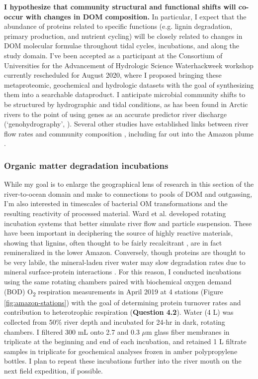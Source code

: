 \documentclass[12pt, letterpaper, twoside]{article}
\begin{document}
\textbf{I hypothesize that community structural and functional shifts will co-occur with changes in DOM composition.} In particular, I expect that the abundance of proteins related to specific functions (e.g. lignin degradation, primary production, and nutrient cycling) will be closely related to changes in DOM molecular formulae throughout tidal cycles, incubations, and along the study domain. I've been accepted as a participant at the Consortium of Universities for the Advancement of Hydrologic Science Waterhackweek workshop currently rescheduled for August 2020, where I proposed bringing these metaproteomic, geochemical and hydrologic datasets with the goal of synthesizing them into a searchable dataproduct. I anticipate microbial community shifts to be structured by hydrographic and tidal conditions, as has been found in Arctic rivers to the point of using genes as an accurate predictor river discharge (‘genohydrography’, \cite{good_predicting_2018}). Several other studies have established links between river flow rates and community composition \cite{crump_synchrony_2005}, including far out into the Amazon plume \cite{doherty_bacterial_2017}. 
 
\bigskip

\subsubsection{Organic matter degradation incubations}

While my goal is to enlarge the geographical lens of research in this section of the river-to-ocean domain and make to connections to pools of DOM and outgassing, I'm also interested in timescales of bacterial OM transformations and the resulting reactivity of processed material. Ward et al. \cite{ward_marine_2018} developed rotating incubation systems that better simulate river flow and particle suspension. These have been important in deciphering the source of highly reactive materials, showing that lignins, often thought to be fairly recalcitrant \cite{hedges_fluxes_1988, gough_terrestrial_1993, opsahl_distribution_1997}, are in fact remineralized in the lower Amazon. Conversely, though proteins are thought to be very labile, the mineral-laden river water may slow degradation rates due to mineral surface-protein interactions \cite{keil_sorptive_1994, mayer_relationships_1994}. For this reason, I conducted incubations using the same rotating chambers paired with biochemical oxygen demand (BOD) O\textsubscript{2} respiration measurements in April 2019 at 4 stations (Figure \ref{fig:amazon-stations}) with the goal of determining protein turnover rates and contribution to heterotrophic respiration (\textbf{Question 4.2}). Water (4 L) was collected from 50\% river depth and incubated for 24-hr in dark, rotating chambers. I filtered 300 mL onto 2.7 and 0.3 $\mu$m glass fiber membranes in triplicate at the beginning and end of each incubation, and retained 1 L filtrate samples in triplicate for geochemical analyses frozen in amber polypropylene bottles. I plan to repeat these incubations further into the river mouth on the next field expedition, if possible. 
\end{document}
